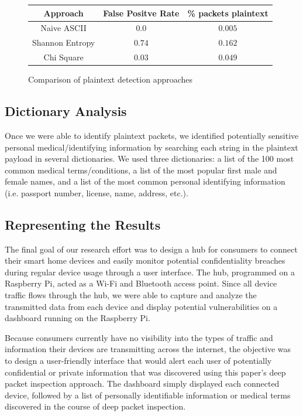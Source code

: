 \begin{figure}
  \caption{Comparison of plaintext detection approaches}
  \begin{center}
    \begin{tabular}{||c c c||} 
    \hline
    Approach & False Positve Rate & \% packets plaintext\\ [0.5ex] 
    \hline\hline
    Naive ASCII & $0.0$ & $0.005$ \\ 
    \hline
    Shannon Entropy &  $0.74$ & $0.162$ \\
    \hline
    Chi Square & $0.03$ & $0.049$ \\
    \hline
    \end{tabular}
  \end{center}
\end{figure}

\subsection{Dictionary Analysis}
Once we were able to identify plaintext packets, we identified potentially sensitive personal medical/identifying information by searching each string in the plaintext payload in several dictionaries. We used three dictionaries: a list of the 100 most common medical terms/conditions, a list of the most popular first male and female names, and a list of the most common personal identifying information (i.e. passport number, license, name, address, etc.). 

\subsection{Representing the Results}

The final goal of our research effort was to design a hub for consumers to connect their smart home devices and easily monitor potential confidentiality breaches during regular device usage through a user interface. The hub, programmed on a Raspberry Pi, acted as a Wi-Fi and Bluetooth access point. Since all device traffic flows through the hub, we were able to capture and analyze the transmitted data from each device and display potential vulnerabilities on a dashboard running on the Raspberry Pi. 

Because consumers currently have no visibility into the types of traffic and information their devices are transmitting across the internet, the objective was to design a user-friendly interface that would alert each user of potentially confidential or private information that was discovered using this paper's deep packet inspection approach. The dashboard simply displayed each connected device, followed by a list of personally identifiable information or medical terms discovered in the course of deep packet inspection. 


